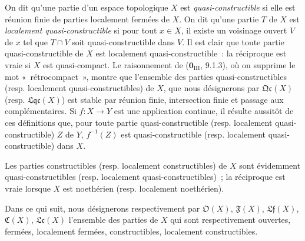 \begin{env}[10.1.1]
\label{IV.10.1.1-fr}
On dit qu'une partie d'un espace topologique $X$ est
\emph{quasi-constructible} si elle est réunion finie de parties localement
fermées de $X$. On dit qu'une partie $T$ de $X$ est \emph{localement
quasi-constructible} si pour tout $x\in X$, il existe un voisinage ouvert $V$
de $x$ tel que $T\cap V$ soit quasi-constructible dans $V$. Il est clair que
toute partie quasi-constructible de $X$ est localement quasi-constructible~:
la réciproque est vraie si $X$ est quasi-compact. Le raisonnement de
($\mathbf 0_{\mathrm{III}}$, 9.1.3), où on supprime le mot
«~rétrocompact~», montre que l'ensemble des parties quasi-constructibles
(resp. localement quasi-constructibles) de $X$, que nous désignerons par
$\mathfrak{Qc}(X)$ (resp. $\mathfrak{Lqc}(X)$) est stable par réunion finie,
intersection finie et passage aux complémentaires. Si $f:X\to Y$ est une
application continue, il résulte aussitôt de ces définitions que, pour toute
partie quasi-constructible (resp. localement quasi-constructible) $Z$ de $Y$,
$f^{-1}(Z)$ est quasi-constructible (resp. localement quasi-constructible)
dans $X$.

Les parties constructibles (resp. localement constructibles) de $X$ sont
évidemment quasi-constructibles (resp. localement quasi-constructibles)~; la
réciproque est vraie lorsque $X$ est noethérien (resp. localement
noethérien).

Dans ce qui suit, nous désignerons respectivement par $\mathfrak O(X)$,
$\mathfrak F(X)$, $\mathfrak{Lf}(X)$, $\mathfrak C(X)$, $\mathfrak{Lc}(X)$
l'ensemble des parties de $X$ qui sont respectivement ouvertes, fermées,
localement fermées, constructibles, localement constructibles.
\end{env}

